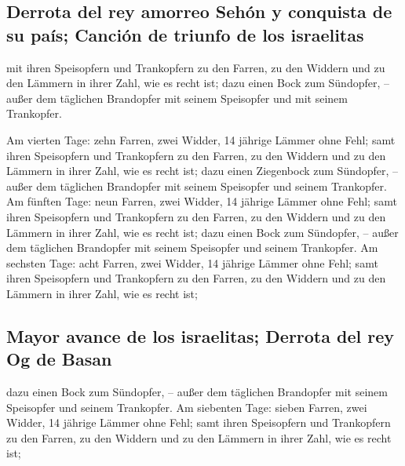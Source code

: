 \hypertarget{derrota-del-rey-amorreo-sehuxf3n-y-conquista-de-su-pauxeds-canciuxf3n-de-triunfo-de-los-israelitas}{%
\subsection{Derrota del rey amorreo Sehón y conquista de su país;
Canción de triunfo de los
israelitas}\label{derrota-del-rey-amorreo-sehuxf3n-y-conquista-de-su-pauxeds-canciuxf3n-de-triunfo-de-los-israelitas}}

 mit ihren Speisopfern und Trankopfern zu den Farren, zu
den Widdern und zu den Lämmern in ihrer Zahl, wie es recht ist;
 dazu einen Bock zum Sündopfer, -- außer dem täglichen
Brandopfer mit seinem Speisopfer und mit seinem Trankopfer.

 Am vierten Tage: zehn Farren, zwei Widder, 14 jährige
Lämmer ohne Fehl;  samt ihren Speisopfern und Trankopfern
zu den Farren, zu den Widdern und zu den Lämmern in ihrer Zahl, wie es
recht ist;  dazu einen Ziegenbock zum Sündopfer, -- außer
dem täglichen Brandopfer mit seinem Speisopfer und seinem Trankopfer.
 Am fünften Tage: neun Farren, zwei Widder, 14 jährige
Lämmer ohne Fehl;  samt ihren Speisopfern und Trankopfern
zu den Farren, zu den Widdern und zu den Lämmern in ihrer Zahl, wie es
recht ist;  dazu einen Bock zum Sündopfer, -- außer dem
täglichen Brandopfer mit seinem Speisopfer und seinem Trankopfer.
 Am sechsten Tage: acht Farren, zwei Widder, 14 jährige
Lämmer ohne Fehl;  samt ihren Speisopfern und Trankopfern
zu den Farren, zu den Widdern und zu den Lämmern in ihrer Zahl, wie es
recht ist;

\hypertarget{mayor-avance-de-los-israelitas-derrota-del-rey-og-de-basan}{%
\subsection{Mayor avance de los israelitas; Derrota del rey Og de
Basan}\label{mayor-avance-de-los-israelitas-derrota-del-rey-og-de-basan}}

 dazu einen Bock zum Sündopfer, -- außer dem täglichen
Brandopfer mit seinem Speisopfer und seinem Trankopfer. 
Am siebenten Tage: sieben Farren, zwei Widder, 14 jährige Lämmer ohne
Fehl;  samt ihren Speisopfern und Trankopfern zu den
Farren, zu den Widdern und zu den Lämmern in ihrer Zahl, wie es recht
ist;

